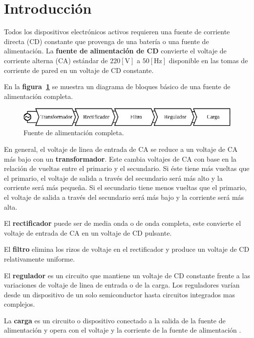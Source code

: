 \section{Introducción}
Todos los dispositivos electrónicos activos requieren una fuente de corriente
directa (CD) constante que provenga de una batería o una fuente de
alimentación. La \textbf{fuente de alimentación de CD} convierte el voltaje de
corriente alterna (CA) estándar de $220[\text{V}]$ a $50[\text{Hz}]$ disponible
en las tomas de corriente de pared en un voltaje de CD constante.

En la \textbf{figura~\ref{diagrama}} se muestra un diagrama de bloques básico de
una fuente de alimentación completa.

\begin{figure}[!h]
\centering
\includegraphics[scale=1.50]{diagramas/00.diagrama.eps}
\caption{Fuente de alimentación completa.}
\label{diagrama}
\end{figure}

En general, el voltaje de linea de entrada de CA se reduce a un voltaje de CA
más bajo con un \textbf{transformador}. Este cambia voltajes de CA con base en
la relación de vueltas entre el primario y el secundario. Si éste tiene más
vueltas que el primario, el voltaje de salida a través del secundario será más
alto y la corriente será más pequeña. Si el secundario tiene menos vueltas que
el primario, el voltaje de salida a través del secundario será más bajo y la
corriente será más alta.

El \textbf{rectificador} puede ser de media onda o de onda completa, este
convierte el voltaje de entrada de CA en un voltaje de CD pulsante.

El \textbf{filtro} elimina los rizos de voltaje en el rectificador y produce un
voltaje de CD relativamente uniforme.

El \textbf{regulador} es un circuito que mantiene un voltaje de CD constante
frente a las variaciones de voltaje de linea de entrada o de la carga. Los
reguladores varían desde un dispositivo de un solo semiconductor hasta circuitos
integrados mas complejos.

La \textbf{carga} es un circuito o dispositivo conectado a la salida de la
fuente de alimentación y opera con el voltaje y la corriente de la fuente de
alimentación \cite{Floyd}.

